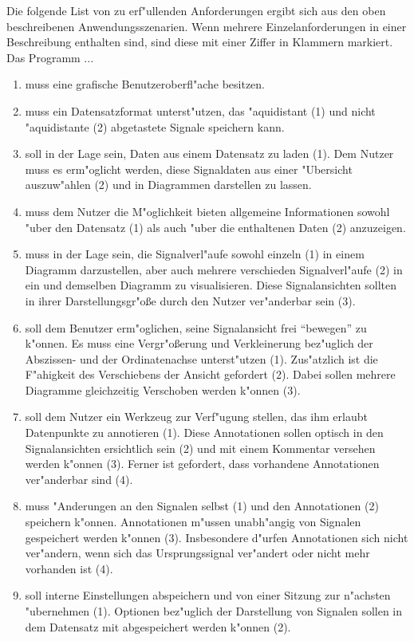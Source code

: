 Die folgende List von zu erf"ullenden Anforderungen ergibt sich aus den oben beschreibenen Anwendungsszenarien.
Wenn mehrere Einzelanforderungen in einer Beschreibung enthalten sind, sind diese mit einer Ziffer in Klammern markiert.
Das Programm ...
\renewcommand{\theenumi}{\Alph{enumi}}
\renewcommand{\labelenumi}{\theenumi )}
\newcommand{\AF}[1]{\item \label{AF:#1}}
\begin{enumerate}
	\AF{gui} muss eine grafische Benutzeroberfl"ache besitzen.
	\AF{datensatz} muss ein Datensatzformat unterst"utzen, das "aquidistant (1) und nicht "aquidistante (2) abgetastete Signale speichern kann.
	\AF{datenmanagement} soll in der Lage sein, Daten aus einem Datensatz zu laden (1).
						 Dem Nutzer muss es erm"oglicht werden, diese Signaldaten aus einer "Ubersicht auszuw"ahlen (2) und in Diagrammen darstellen zu lassen.
	\AF{dateninformation} muss dem Nutzer die M"oglichkeit bieten allgemeine Informationen sowohl "uber den Datensatz (1) als auch "uber die enthaltenen Daten (2) anzuzeigen.
	\AF{diagramm} muss in der Lage sein, die Signalverl"aufe sowohl einzeln (1) in einem Diagramm darzustellen, aber auch mehrere verschieden Signalverl"aufe (2) in ein und demselben Diagramm zu visualisieren.
				  Diese Signalansichten sollten in ihrer Darstellungsgr"o\ss e durch den Nutzer ver"anderbar sein (3).
	\AF{ansicht} soll dem Benutzer erm"oglichen, seine Signalansicht frei "`bewegen"' zu k"onnen.
				 Es muss eine Vergr"o\ss erung und Verkleinerung bez"uglich der Abszissen- und der Ordinatenachse unterst"utzen (1).
				 Zus"atzlich ist die F"ahigkeit des Verschiebens der Ansicht gefordert (2).
				 Dabei sollen mehrere Diagramme gleichzeitig Verschoben werden k"onnen (3).
	\AF{annotationen} soll dem Nutzer ein Werkzeug zur Verf"ugung stellen, das ihm erlaubt Datenpunkte zu annotieren (1).
					  Diese Annotationen sollen optisch in den Signalansichten ersichtlich sein (2) und mit einem Kommentar versehen werden k"onnen (3).
				  	  Ferner ist gefordert, dass vorhandene Annotationen ver"anderbar sind (4).
	\AF{io} muss "Anderungen an den Signalen selbst (1) und den Annotationen (2) speichern k"onnen.
			Annotationen m"ussen unabh"angig von Signalen gespeichert werden k"onnen (3).
			Insbesondere d"urfen Annotationen sich nicht ver"andern, wenn sich das Ursprungssignal ver"andert oder nicht mehr vorhanden ist (4).
	\AF{einstellungen} soll interne Einstellungen abspeichern und von einer Sitzung zur n"achsten "ubernehmen (1).
					   Optionen bez"uglich der Darstellung von Signalen sollen in dem Datensatz mit abgespeichert werden k"onnen (2).
\end{enumerate}

